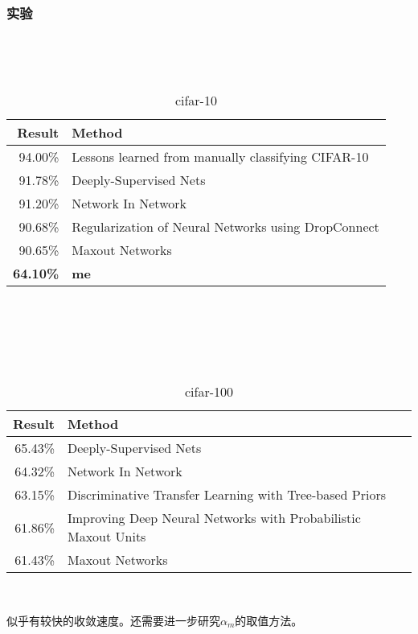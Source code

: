 \documentclass{article}
\begin{document}
\begin{CJK}{UTF8}{gbsn}
\subsubsection{实验}
\begin{table}[!ht]\
\caption{cifar-10}
~\\
\centering
\begin{tabular}{rl} \toprule 
Result	&   Method \\ \midrule
94.00\%		&   Lessons learned from manually classifying CIFAR-10\\  \midrule
91.78\%	&   Deeply-Supervised Nets\\  \midrule
91.20\%	&   Network In Network\\  \midrule
90.68\%	&   Regularization of Neural Networks using DropConnect\\  \midrule
90.65\%	&   Maxout Networks\\   \midrule
\textbf{64.10\%}    &   \textbf{me}\\ \bottomrule
\end{tabular}\\
\end{table}

\begin{table}[!ht]\
\caption{cifar-100}
~\\
\centering
\begin{tabular}{rl} \toprule 
Result	&   Method \\ \midrule
65.43\%	&   Deeply-Supervised Nets\\  \midrule
64.32\%	&   Network In Network\\  \midrule
63.15\%	&   Discriminative Transfer Learning with Tree-based Priors\\  \midrule
61.86\%	&   Improving Deep Neural Networks with Probabilistic Maxout Units\\  \midrule
61.43\%	&   Maxout Networks\\ \bottomrule
\end{tabular}\\
\end{table}

似乎有较快的收敛速度。还需要进一步研究$\alpha_m$的取值方法。



\end{CJK}
\end{document}
